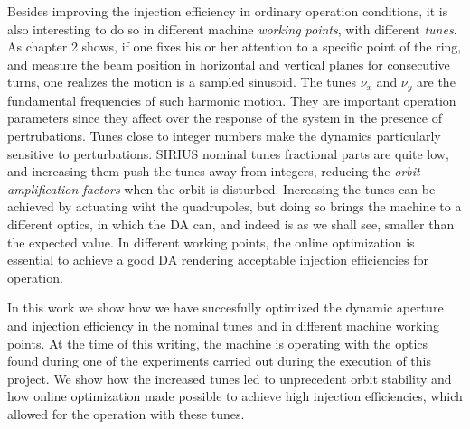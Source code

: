 Besides improving the injection efficiency in ordinary operation conditions, it is also interesting to do so in different machine \textit{working points}, with different \textit{tunes}. As chapter 2 shows, if one fixes his or her attention to a specific point of the ring, and measure the beam position in horizontal and vertical planes for consecutive turns, one realizes the motion is a sampled sinusoid. The tunes $\nu_x$ and $\nu_y$ are the fundamental frequencies of such harmonic motion. They are important operation parameters  since they affect over the response of the system in the presence of pertrubations. Tunes close to integer numbers make the dynamics particularly sensitive to perturbations. SIRIUS nominal tunes fractional parts are quite low, and increasing them push the tunes away from integers, reducing the \textit{orbit amplification factors} when the orbit is disturbed. Increasing the tunes can be achieved by actuating wiht the quadrupoles, but doing so brings the machine to a different optics, in which the DA can, and indeed is as we shall see, smaller than the expected value. In different working points, the online optimization is essential to achieve a good DA rendering acceptable injection efficiencies for operation.

In this work we show how we have succesfully optimized the dynamic aperture and injection efficiency in the nominal tunes and in different machine working points. At the time of this writing, the machine is operating with the optics found during one of the experiments carried out during the execution of this project. We show how the increased tunes led to unprecedent orbit stability and how online optimization made possible to achieve high injection efficiencies, which allowed for the operation with these tunes.
